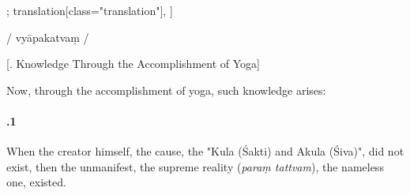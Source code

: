 \begin{alignment}[
  texts=edition[class="edition"];
  translation[class="translation"],
  ]
\begin{edition}
\begin{prose}
/
\dd{}
\dd{}
\dd{}
vyāpakatvaṃ\dd{}
/
    \end{prose}
  \end{edition}
  \begin{translation}
\centerline{\textrm{\small{[. Knowledge Through the Accomplishment of Yoga]}}}
    \label{knowledge}
    \bigskip
    \begin{tlate}
      \noindent
  Now, through the accomplishment of yoga, such knowledge arises:\\
      
     \paragraph{.1} When the creator himself, the cause, the "Kula (Śakti) and Akula (Śiva)", did not exist, then the unmanifest, the supreme reality (\textit{paraṃ tattvam}), the nameless one, existed.\\


\end{tlate}
\end{translation}
\end{alignment}

